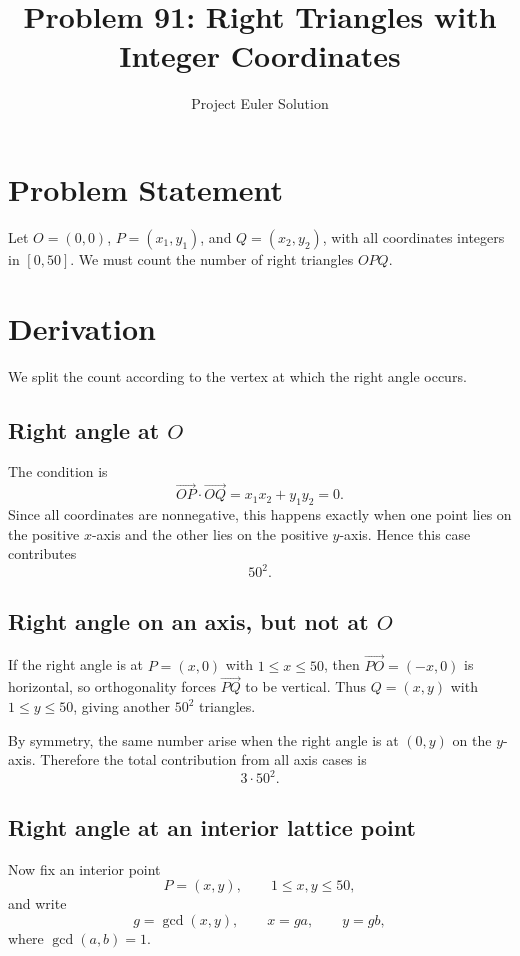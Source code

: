 \documentclass[12pt]{article}
\title{Problem 91: Right Triangles with Integer Coordinates}
\author{Project Euler Solution}
\date{}
\begin{document}
\maketitle

\section{Problem Statement}

Let $O=(0,0)$, $P=(x_1,y_1)$, and $Q=(x_2,y_2)$, with all coordinates integers in $[0,50]$. We must count the number of right triangles $OPQ$.

\section{Derivation}

We split the count according to the vertex at which the right angle occurs.

\subsection*{Right angle at $O$}

The condition is
\[
\overrightarrow{OP}\cdot \overrightarrow{OQ}=x_1x_2+y_1y_2=0.
\]
Since all coordinates are nonnegative, this happens exactly when one point lies on the positive $x$-axis and the other lies on the positive $y$-axis. Hence this case contributes
\[
50^2.
\]

\subsection*{Right angle on an axis, but not at $O$}

If the right angle is at $P=(x,0)$ with $1\le x\le 50$, then $\overrightarrow{PO}=(-x,0)$ is horizontal, so orthogonality forces $\overrightarrow{PQ}$ to be vertical. Thus $Q=(x,y)$ with $1\le y\le 50$, giving another $50^2$ triangles.

By symmetry, the same number arise when the right angle is at $(0,y)$ on the $y$-axis. Therefore the total contribution from all axis cases is
\[
3\cdot 50^2.
\]

\subsection*{Right angle at an interior lattice point}

Now fix an interior point
\[
P=(x,y),\qquad 1\le x,y\le 50,
\]
and write
\[
g=\gcd(x,y),\qquad x=ga,\qquad y=gb,
\]
where $\gcd(a,b)=1$.
\end{document}
